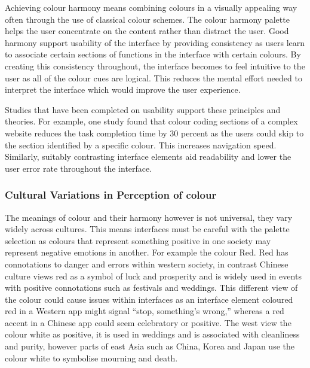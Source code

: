 \documentclass[]{project_final}
\begin{document}
Achieving colour harmony means combining colours in a visually appealing way often through the use of classical colour schemes. The colour harmony palette helps the user concentrate on the content rather than distract the user. Good harmony support usability of the interface by providing consistency as users learn to associate certain sections of functions in the interface with certain colours. By creating this consistency throughout, the interface becomes to feel intuitive to the user as all of the colour cues are logical. This reduces the mental effort needed to interpret the interface which would improve the user experience.

Studies that have been completed on usability support these principles and theories. For example, one study found that colour coding sections of a complex website reduces the task completion time by 30 percent as the users could skip to the section identified by a specific colour. This increases navigation speed. Similarly, suitably contrasting interface elements aid readability and lower the user error rate throughout the interface.\cite{colour_what_nodate}

\subsubsection{Cultural Variations in Perception of colour}

The meanings of colour and their harmony however is not universal, they vary widely across cultures. This means interfaces must be careful with the palette selection as colours that represent something positive in one society may represent negative emotions in another. For example the colour Red. Red has connotations to danger and errors within western society, in contrast Chinese culture views red as a symbol of luck and prosperity and is widely used in events with positive connotations such as festivals and weddings. This different view of the colour could cause issues within interfaces as an interface element coloured red in a Western app might signal “stop, something’s wrong,” whereas a red accent in a Chinese app could seem celebratory or positive. The west view the colour white as positive, it is used in weddings and is associated with cleanliness and purity, however parts of east Asia such as China, Korea and Japan use the colour white to symbolise mourning and death.

\end{document}
